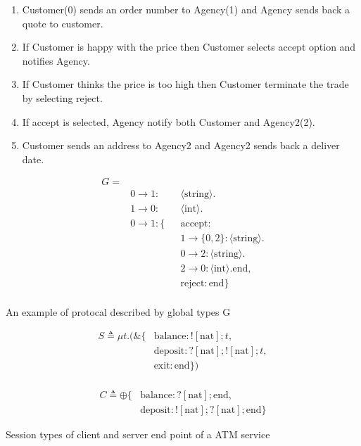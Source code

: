 \begin{table}
  \begin{minipage}{0.45\textwidth}
    \begin{enumerate}
      \item Customer(0) sends an order number to Agency(1) and Agency sends back a quote to customer.
      \item If Customer is happy with the price then Customer selects accept option and notifies Agency.
      \item If Customer thinks the price is too high then Customer terminate the trade by selecting reject.
      \item If accept is selected, Agency notify both Customer and Agency2(2). 
      \item Customer sends an address to Agency2 and Agency2 sends back a deliver date.
    \end{enumerate}
  \end{minipage}
  \hfill
  \begin{minipage}{0.45\textwidth}
    \begin{align*}
      G = \\
      & 0 \rightarrow 1: && \langle \text{string} \rangle .\\
      & 1 \rightarrow 0: && \langle \text{int} \rangle .\\
      & 0 \rightarrow 1: \{ && \text{accept}: \\
      & && 1 \rightarrow \{ 0, 2 \}: \langle \text{string} \rangle . \\
      & &&  0 \rightarrow 2: \langle \text{string} \rangle .\\
      & &&  2 \rightarrow 0: \langle \text{int} \rangle . \text{end}, \\
      & && \text{reject}: \text{end} \} \\
    \end{align*}
  \end{minipage}
  \caption{An example of protocal described by global types G}
  \label{b:mpst:gtex}
\end{table}
\begin{table}[ht]
  \begin{minipage}{0.45\textwidth}
    \begin{align*}
      S \triangleq \mu t.(\&\{ & \text{balance}: ![\text{nat}];t, \\
        & \text{deposit}: ?[\text{nat}];![\text{nat}];t, \\
        & \text{exit}: \text{end}\}) \\
    \end{align*}
  \end{minipage}
  \hfill
  \begin{minipage}{0.45\textwidth}
    \begin{align*}
      C \triangleq \oplus \{ &\text{balance}: ?[\text{nat}];\text{end}, \\
                             &\text{deposit}: ![\text{nat}];?[\text{nat}];\text{end} \} 
    \end{align*}
  \end{minipage}
  \caption{Session types of client and server end point of a ATM service}
  \label{b:mpst:ltex}
\end{table}
